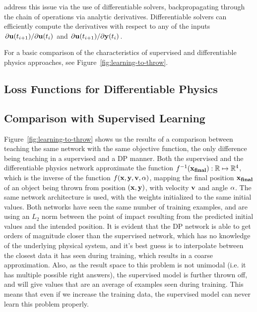 \cite{holl2019pdecontrol} address this issue via the use of differentiable
solvers, backpropagating through the chain of operations via analytic
derivatives.  Differentiable solvers can efficiently compute the derivatives
with respect to any of the inputs $\pdv*{\vb{u}(t_{i+1})}{\vb{u}(t_i)}$ and
$\pdv*{\vb{u}(t_{i+1})}{\vb{y}(t_i)}$. 


For a basic comparison of the characteristics of supervised and differentiable
physics approaches, see Figure~\ref{fig:learning-to-throw}.


\subsection{Loss Functions for Differentiable Physics}
\label{dp-loss}


\subsection{Comparison with Supervised Learning}


Figure~\ref{fig:learning-to-throw} shows us the results of a comparison between
teaching the same network with the same objective function, the only difference
being teaching in a supervised and a \ac{DP} manner.  Both the supervised and
the differentiable physics network approximate the function
$f^{-1}(\vb{x_{final}}): \mathbb{R} \mapsto \mathbb{R}^4$, which is the inverse
of the function $f(\vb{x}, \vb{y}, \vb{v}, \vb{\alpha})$, mapping the final
position $\vb{x_{final}}$ of an object being thrown from position $(\vb{x},
\vb{y})$, with velocity $\vb{v}$ and angle $\vb{\alpha}$. The same network
architecture is used, with the weights initialized to the same initial values.
Both networks have seen the same number of training examples, and are using an
$L_2$ norm between the point of impact resulting from the predicted initial
values and the intended position. It is evident that the DP network is able to
get orders of magnitude closer than the supervised network, which has no
knowledge of the underlying physical system, and it's best guess is to
interpolate between the closest data it has seen during training, which results
in a coarse approximation. Also, as the result space to this problem is not
unimodal (i.e. it has multiple possible right answers), the supervised model is
further thrown off, and will give values that are an average of examples seen
during training. This means that even if we increase the training data, the
supervised model can never learn this problem properly.  


